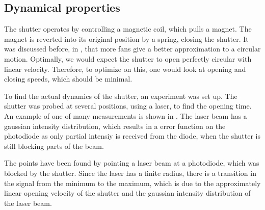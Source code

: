 \newpage
\subsection{Dynamical properties}
The shutter operates by controlling a magnetic coil, which pulls a magnet. The magnet is reverted into its original position by a spring, closing the shutter. 
It was discussed before, in , that more fans give a better approximation to a circular motion. Optimally, we would expect the shutter to open perfectly circular with linear velocity. Therefore, to optimize on this, one would look at opening and closing speeds, which should be minimal.

\label{subsec:shutter_dynamical}

To find the actual dynamics of the shutter, an experiment was set up. The shutter was probed at several positions, using a laser, to find the opening time. An example of one of many measurements is shown in . The laser beam has a gaussian intensity distribution, which results in a error function on the photodiode as only partial intensiy is received from the diode, when the shutter is still blocking parts of the beam.

The points have been found by pointing a laser beam at a photodiode, which was blocked by the shutter. Since the laser has a finite radius, there is a transition in the signal from the minimum to the maximum, which is due to the approximately linear opening velocity of the shutter and the gaussian intensity distribution of the laser beam.

